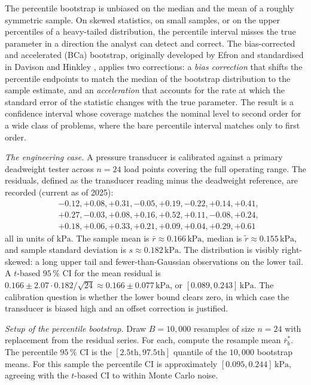 The percentile bootstrap is unbiased on the median and the mean of
a roughly symmetric sample. On skewed statistics, on small samples,
or on the upper percentiles of a heavy-tailed distribution, the
percentile interval misses the true parameter in a direction the
analyst can detect and correct. The bias-corrected and accelerated
(BCa) bootstrap, originally developed by Efron
\cite{paper:ch08-efron-bca-1987} and standardised in Davison and
Hinkley \cite{text:ch08-davison-hinkley-1997}, applies two
corrections: a \emph{bias correction} that shifts the percentile
endpoints to match the median of the bootstrap distribution to the
sample estimate, and an \emph{acceleration} that accounts for the
rate at which the standard error of the statistic changes with the
true parameter. The result is a confidence interval whose coverage
matches the nominal level to second order for a wide class of
problems, where the bare percentile interval matches only to first
order.

\textit{The engineering case.} A pressure transducer is calibrated
against a primary deadweight tester across $n = 24$ load points
covering the full operating range. The residuals, defined as the
transducer reading minus the deadweight reference, are recorded
(current as of 2025):
\[
\begin{aligned}
&-0.12, +0.08, +0.31, -0.05, +0.19, -0.22, +0.14, +0.41, \\
&+0.27, -0.03, +0.08, +0.16, +0.52, +0.11, -0.08, +0.24, \\
&+0.18, +0.06, +0.33, +0.21, +0.09, +0.04, +0.29, +0.61
\end{aligned}
\]
all in units of $\si{\kilo\pascal}$. The sample mean is
$\bar{r} \approx 0.166 \,\si{\kilo\pascal}$, median is
$\tilde{r} \approx 0.155 \,\si{\kilo\pascal}$, and sample standard
deviation is $s \approx 0.182 \,\si{\kilo\pascal}$. The
distribution is visibly right-skewed: a long upper tail and
fewer-than-Gaussian observations on the lower tail. A $t$-based
$95 \,\%$ CI for the mean residual is
$0.166 \pm 2.07 \cdot 0.182/\sqrt{24} \approx 0.166 \pm 0.077
\,\si{\kilo\pascal}$, or $[0.089, 0.243] \,\si{\kilo\pascal}$. The
calibration question is whether the lower bound clears zero, in
which case the transducer is biased high and an offset correction
is justified.

\textit{Setup of the percentile bootstrap.} Draw $B = 10{,}000$
resamples of size $n = 24$ with replacement from the residual
series. For each, compute the resample mean
$\bar{r}^{*}_{b}$. The percentile $95 \,\%$ CI is the
$[2.5\text{th}, 97.5\text{th}]$ quantile of the $10{,}000$ bootstrap
means. For this sample the percentile CI is approximately
$[0.095, 0.244] \,\si{\kilo\pascal}$, agreeing with the $t$-based
CI to within Monte Carlo noise.

